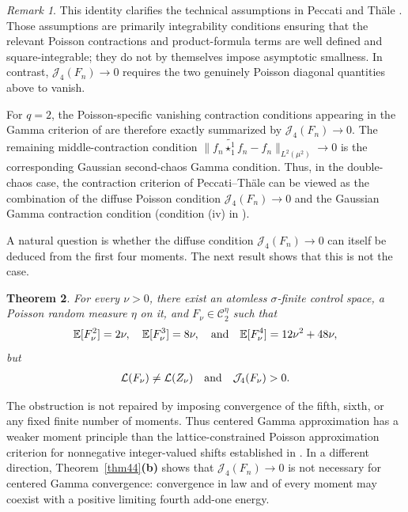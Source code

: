 \documentclass[letterpaper,11pt,reqno]{amsart}
\numberwithin{equation}{section}
\theoremstyle{plain}
\newtheorem{theorem}{Theorem}[section]
\theoremstyle{definition}
\theoremstyle{remark}
\newtheorem{remark}[theorem]{Remark}
\newcommand{\E}{\mathbb{E}}
\newcommand{\cC}{\mathcal{C}}
\newcommand{\cL}{\mathcal{L}}
\newcommand{\noi}{\noindent}
\newcommand{\Jfour}{\mathcal J_4}
\newcommand{\wt}{\widetilde}
\newcommand{\s}{\sigma}
\newcommand{\AND}{\quad{\rm and}\quad}
\begin{document}
\begin{remark}
This identity clarifies the technical assumptions in
Peccati and Th\"ale \cite[Section~3-(VIII)]{PT13}.  Those assumptions
are primarily integrability conditions ensuring that the relevant
Poisson contractions and product-formula terms are well defined and
square-integrable; they do not by themselves impose asymptotic
smallness.  In contrast, $\Jfour(F_n)\to0$ requires the two genuinely
Poisson diagonal quantities above to vanish.

For $q=2$, the Poisson-specific vanishing contraction conditions
appearing in the Gamma criterion of \cite{PT13} are therefore exactly
summarized by $\Jfour(F_n)\to0$.  The remaining middle-contraction
condition
 $\| f_n\wt{\star_1^1}f_n -f_n\|_{L^2(\mu^2)}
 \to 0$
is the corresponding Gaussian second-chaos Gamma condition.  Thus,
in the double-chaos case, the contraction criterion of
Peccati--Th\"ale can be viewed as the combination of the diffuse
Poisson condition $\Jfour(F_n)\to0$ and the Gaussian Gamma
contraction condition (condition (iv) in \cite[Theorem~1.2]{NP09b}).
\end{remark}


A natural question is whether the diffuse condition
$\Jfour(F_n)\to0$ can itself be deduced from the first four moments.
The next result shows that this is not the case.


\begin{theorem}
\label{thm3}
For every $\nu>0$, there exist an atomless $\s$-finite control
space, a Poisson random measure $\eta$ on it, and
$F_\nu\in\cC_2^\eta$ such that
\noi
\begin{align}
 \E[F_\nu^2]=2\nu,
 \quad
 \E[F_\nu^3]=8\nu,
\AND
 \E[F_\nu^4]=12\nu^2+48\nu,
 \label{exact_four}
\end{align}
but
\noi
\begin{align}
 \cL(F_\nu)\neq\cL(Z_\nu)
 \AND
 \Jfour(F_\nu)>0.
 \label{thm4_2}
\end{align}
\end{theorem}

The obstruction is not repaired by imposing convergence of the
fifth, sixth, or any fixed finite number of moments.  Thus centered
Gamma approximation has a weaker moment principle than the
lattice-constrained Poisson approximation criterion for nonnegative
integer-valued shifts established in \cite{Zhe26b}.  In a different
direction, Theorem~\ref{thm44}{\bf(b)} shows that $\Jfour(F_n)\to0$
is not necessary for centered Gamma convergence: convergence in law
and of every moment may coexist with a positive limiting fourth
add-one energy.
\end{document}
